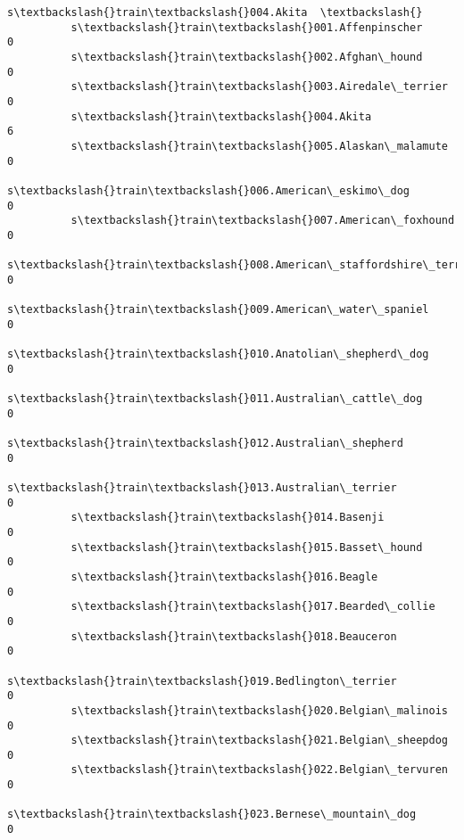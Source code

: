 \documentclass[11pt]{article}
\begin{document}
\begin{Verbatim}[commandchars=\\\{\}]
                                                          s\textbackslash{}train\textbackslash{}004.Akita  \textbackslash{}
          s\textbackslash{}train\textbackslash{}001.Affenpinscher                                       0   
          s\textbackslash{}train\textbackslash{}002.Afghan\_hound                                        0   
          s\textbackslash{}train\textbackslash{}003.Airedale\_terrier                                    0   
          s\textbackslash{}train\textbackslash{}004.Akita                                               6   
          s\textbackslash{}train\textbackslash{}005.Alaskan\_malamute                                    0   
          s\textbackslash{}train\textbackslash{}006.American\_eskimo\_dog                                 0   
          s\textbackslash{}train\textbackslash{}007.American\_foxhound                                   0   
          s\textbackslash{}train\textbackslash{}008.American\_staffordshire\_terrier                      0   
          s\textbackslash{}train\textbackslash{}009.American\_water\_spaniel                              0   
          s\textbackslash{}train\textbackslash{}010.Anatolian\_shepherd\_dog                              0   
          s\textbackslash{}train\textbackslash{}011.Australian\_cattle\_dog                               0   
          s\textbackslash{}train\textbackslash{}012.Australian\_shepherd                                 0   
          s\textbackslash{}train\textbackslash{}013.Australian\_terrier                                  0   
          s\textbackslash{}train\textbackslash{}014.Basenji                                             0   
          s\textbackslash{}train\textbackslash{}015.Basset\_hound                                        0   
          s\textbackslash{}train\textbackslash{}016.Beagle                                              0   
          s\textbackslash{}train\textbackslash{}017.Bearded\_collie                                      0   
          s\textbackslash{}train\textbackslash{}018.Beauceron                                           0   
          s\textbackslash{}train\textbackslash{}019.Bedlington\_terrier                                  0   
          s\textbackslash{}train\textbackslash{}020.Belgian\_malinois                                    0   
          s\textbackslash{}train\textbackslash{}021.Belgian\_sheepdog                                    0   
          s\textbackslash{}train\textbackslash{}022.Belgian\_tervuren                                    0   
          s\textbackslash{}train\textbackslash{}023.Bernese\_mountain\_dog                                0   

\end{Verbatim}
\end{document}

